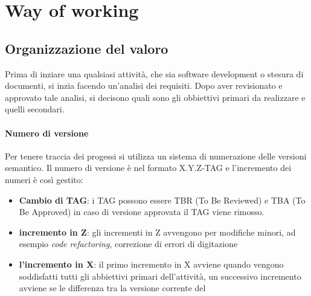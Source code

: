 \section{Way of working}
\subsection{Organizzazione del valoro}
Prima di inziare una qualsiasi attività, che sia software development o stesura
di documenti, si inzia facendo un'analisi dei requisiti.
Dopo aver revisionato e approvato tale analisi, si decisono quali sono gli obbiettivi
primari da realizzare e quelli secondari.

\paragraph{Numero di versione}
Per tenere traccia dei progessi si utilizza un sistema di numerazione delle versioni
semantico.
Il numero di versione è nel formato X.Y.Z-TAG e l'incremento dei numeri è così gestito:
\begin{itemize}
  \item \textbf{Cambio di TAG}: i TAG possono essere TBR (To Be Reviewed) e TBA (To Be Approved)
  in caso di versione approvata il TAG viene rimosso.
  \item \textbf{incremento in Z}: gli incrementi in Z avvengono per modifiche minori,
  ad esempio \textit{code refactoring\glos}, correzione di errori di digitazione
  \item \textbf{l'incremento in X}: il primo incremento in X avviene quando vengono
  soddisfatti tutti gli abbiettivi primari dell'attività, un successivo incremento
  avviene se le differenza tra la versione corrente del
\end{itemize}
